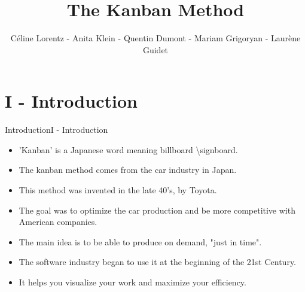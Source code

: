 \documentclass[10pt]{beamer}
\author{Céline Lorentz - Anita Klein - Quentin Dumont - Mariam Grigoryan - Laurène Guidet}
\title{The Kanban Method}
\newcommand{\PI}{I - Introduction}
\begin{document}
    
\begin{frame}

    \maketitle

\end{frame}
\section{\PI} 
\begin{frame}{Introduction}{\PI} 
    \begin{itemize}
        \item 'Kanban' is a Japanese word meaning billboard \textbackslash signboard. 
        \item The kanban method comes from the car industry in Japan.
        \item This method was invented in the late 40's, by Toyota.
        \item The goal was to optimize the car production and be more competitive with American companies.
        \item The main idea is to be able to produce on demand, "just in time".
        \item The software industry began to use it at the beginning of the 21st Century.
        \item It helps you visualize your work and maximize your efficiency.
    \end{itemize}  

\end{frame}
\end{document}
